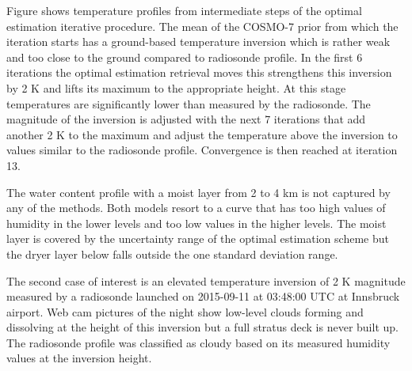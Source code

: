     Figure  shows temperature profiles from intermediate
    steps of the optimal estimation iterative procedure. The mean of the
    COSMO-7 prior from which the iteration starts has a ground-based
    temperature inversion which is rather weak and too close to the ground
    compared to radiosonde profile. In the first 6 iterations the optimal
    estimation retrieval moves this strengthens this inversion by 2 K and
    lifts its maximum to the appropriate height. At this stage temperatures
    are significantly lower than measured by the radiosonde. The magnitude
    of the inversion is adjusted with the next 7 iterations that add another
    2 K to the maximum and adjust the temperature above the inversion to
    values similar to the radiosonde profile. Convergence is then reached at
    iteration 13.

    The water content profile with a moist layer from 2 to 4 km is not captured
    by any of the methods. Both models resort to a curve that has too high
    values of humidity in the lower levels and too low values in the higher
    levels. The moist layer is covered by the uncertainty range of the optimal
    estimation scheme but the dryer layer below falls outside the one standard
    deviation range.

        {}

\stopsubsection

\startsubsection[title={Elevated Temperature Inversion}]

    The second case of interest is an elevated temperature inversion of 2 K
    magnitude measured by a radiosonde launched on 2015-09-11 at 03:48:00 UTC
    at Innsbruck airport. Web cam pictures of the night show low-level clouds
    forming and dissolving at the height of this inversion but a full stratus
    deck is never built up. The radiosonde profile was classified as cloudy
    based on its measured humidity values at the inversion height.

